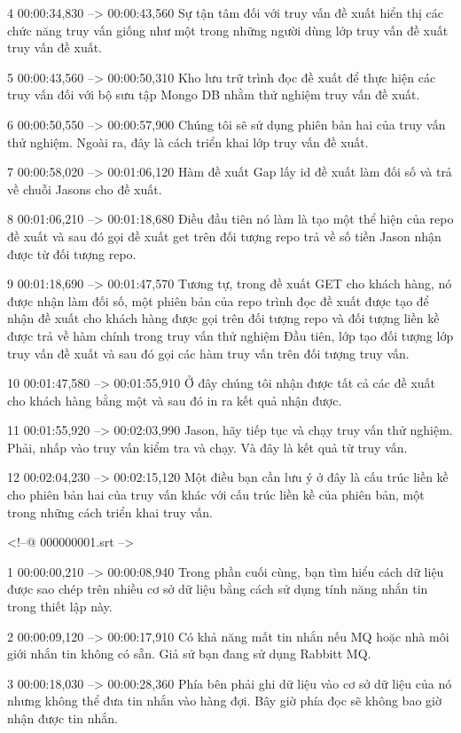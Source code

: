 4
00:00:34,830 --> 00:00:43,560
Sự tận tâm đối với truy vấn đề xuất hiển thị các chức năng truy vấn giống như một trong những người dùng lớp truy vấn đề xuất truy vấn đề xuất.

5
00:00:43,560 --> 00:00:50,310
Kho lưu trữ trình đọc đề xuất để thực hiện các truy vấn đối với bộ sưu tập Mongo DB nhằm thử nghiệm truy vấn đề xuất.

6
00:00:50,550 --> 00:00:57,900
Chúng tôi sẽ sử dụng phiên bản hai của truy vấn thử nghiệm.  Ngoài ra, đây là cách triển khai lớp truy vấn đề xuất.

7
00:00:58,020 --> 00:01:06,120
Hàm đề xuất Gap lấy id đề xuất làm đối số và trả về chuỗi Jasons cho đề xuất.

8
00:01:06,210 --> 00:01:18,680
Điều đầu tiên nó làm là tạo một thể hiện của repo đề xuất và sau đó gọi đề xuất get trên đối tượng repo trả về số tiền Jason nhận được từ đối tượng repo.

9
00:01:18,690 --> 00:01:47,570
Tương tự, trong đề xuất GET cho khách hàng, nó được nhận làm đối số, một phiên bản của repo trình đọc đề xuất được tạo để nhận đề xuất cho khách hàng được gọi trên đối tượng repo và đối tượng liền kề được trả về hàm chính trong truy vấn thử nghiệm  Đầu tiên, lớp tạo đối tượng lớp truy vấn đề xuất và sau đó gọi các hàm truy vấn trên đối tượng truy vấn.

10
00:01:47,580 --> 00:01:55,910
Ở đây chúng tôi nhận được tất cả các đề xuất cho khách hàng bằng một và sau đó in ra kết quả nhận được.

11
00:01:55,920 --> 00:02:03,990
Jason, hãy tiếp tục và chạy truy vấn thử nghiệm.  Phải, nhấp vào truy vấn kiểm tra và chạy.  Và đây là kết quả từ truy vấn.

12
00:02:04,230 --> 00:02:15,120
Một điều bạn cần lưu ý ở đây là cấu trúc liền kề cho phiên bản hai của truy vấn khác với cấu trúc liền kề của phiên bản, một trong những cách triển khai truy vấn.

<!--@ 000000001.srt -->

1
00:00:00,210 --> 00:00:08,940
Trong phần cuối cùng, bạn tìm hiểu cách dữ liệu được sao chép trên nhiều cơ sở dữ liệu bằng cách sử dụng tính năng nhắn tin trong thiết lập này.

2
00:00:09,120 --> 00:00:17,910
Có khả năng mất tin nhắn nếu MQ hoặc nhà môi giới nhắn tin không có sẵn.  Giả sử bạn đang sử dụng Rabbitt MQ.

3
00:00:18,030 --> 00:00:28,360
Phía bên phải ghi dữ liệu vào cơ sở dữ liệu của nó nhưng không thể đưa tin nhắn vào hàng đợi.  Bây giờ phía đọc sẽ không bao giờ nhận được tin nhắn.

